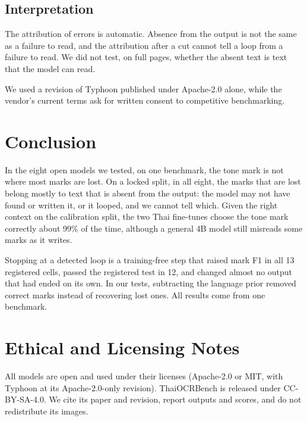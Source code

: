 \subsection{Interpretation}
The attribution of errors is automatic. Absence from the output is not the same as a failure to read, and the attribution after a cut cannot tell a loop from a failure to read. We did not test, on full pages, whether the absent text is text that the model can read.

We used a revision of Typhoon published under Apache-2.0 alone, while the vendor's current terms ask for written consent to competitive benchmarking.

\section{Conclusion}
In the eight open models we tested, on one benchmark, the tone mark is not where most marks are lost. On a locked split, in all eight, the marks that are lost belong mostly to text that is absent from the output: the model may not have found or written it, or it looped, and we cannot tell which. Given the right context on the calibration split, the two Thai fine-tunes choose the tone mark correctly about 99\% of the time, although a general 4B model still misreads some marks as it writes.

Stopping at a detected loop is a training-free step that raised mark F1 in all 13 registered cells, passed the registered test in 12, and changed almost no output that had ended on its own. In our tests, subtracting the language prior removed correct marks instead of recovering lost ones. All results come from one benchmark.

\section*{Ethical and Licensing Notes}
All models are open and used under their licenses (Apache-2.0 or MIT, with Typhoon at its Apache-2.0-only revision). ThaiOCRBench is released under CC-BY-SA-4.0. We cite its paper and revision, report outputs and scores, and do not redistribute its images.
